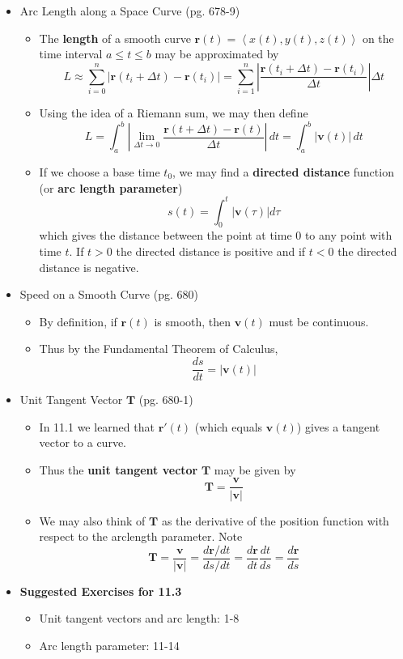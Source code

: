 \documentclass[12pt]{article}
\theoremstyle{plain}
\theoremstyle{definition}
\theoremstyle{remark}
\newcommand{\vect}[1]{\mathbf{#1}}
\newcommand{\dvar}[1]{\,d{#1}}
\begin{document}
		\begin{itemize}
		\item Arc Length along a Space Curve (pg. 678-9)
			\begin{itemize}
			\item The \textbf{length} of a smooth curve $\vect{r}(t) = \left<x(t),y(t),z(t)\right>$ on the time interval $a \leq t \leq b$ may be approximated by \[L \approx \sum_{i=0}^n |\vect{r}(t_i+\Delta{t})-\vect{r}(t_i)|=\sum_{i=1}^n \left|\frac{\vect{r}(t_i+\Delta{t})-\vect{r}(t_i)}{\Delta{t}}\right|\Delta{t}\]
			\item Using the idea of a Riemann sum, we may then define \[L = \int_a^b \left|\lim_{\Delta{t}\to0}\frac{\vect{r}(t+\Delta{t})-\vect{r}(t)}{\Delta{t}}\right| \dvar{t} = \int_a^b |\vect{v}(t)| \dvar{t}\]
			\item If we choose a base time $t_0$, we may find a \textbf{directed distance} function (or \textbf{arc length parameter}) \[s(t) = \int_0^t |\vect{v}(\tau)|d\tau\] which gives the distance between the point at time $0$ to any point with time $t$.  If $t>0$ the directed distance is positive and if $t<0$ the directed distance is negative.
			\end{itemize}
		\item Speed on a Smooth Curve (pg. 680)
			\begin{itemize}
			\item By definition, if $\vect{r}(t)$ is smooth, then $\vect{v}(t)$ must be continuous.
			\item Thus by the Fundamental Theorem of Calculus, \[\frac{ds}{dt} = |\vect{v}(t)|\]
			\end{itemize}
		\item Unit Tangent Vector $\vect{T}$ (pg. 680-1)
			\begin{itemize}
			\item In 11.1 we learned that $\vect{r}'(t)$ (which equals $\vect{v}(t)$) gives a tangent vector to a curve.
			\item Thus the \textbf{unit tangent vector} $\vect{T}$ may be given by \[\vect{T} = \frac{\vect{v}}{|\vect{v}|}\]
			\item We may also think of $\vect{T}$ as the derivative of the position function with respect to the arclength parameter. Note \[\vect{T} = \frac{\vect{v}}{|\vect{v}|}=\frac{d\vect{r}/dt}{ds/dt} = \frac{d\vect{r}}{dt}\frac{dt}{ds} = \frac{d\vect{r}}{ds} \]
			\end{itemize}
		\item \textbf{Suggested Exercises for 11.3}
			\begin{itemize}
			\item Unit tangent vectors and arc length: 1-8
			\item Arc length parameter: 11-14
			\end{itemize}
		\end{itemize}
	
\end{document}
